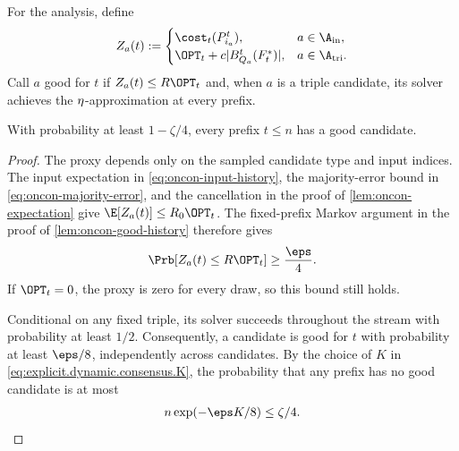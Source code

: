 For the analysis, define
\begin{align}
    \edproxy{a}{t}:=
    \begin{cases}
        \cost_t(P_{i_a}^t),&a\in\A_{\rm in},\\
        \OPT_t+c|B_{Q_a}^t(F_t^*)|,&a\in\A_{\rm tri}.
    \end{cases}
    \label{eq:explicit.consensus.proxy}
\end{align}
Call $ a $ good for $ t $ if $ \edproxy{a}{t}\le R\OPT_t $ and, when $ a $ is a triple candidate, its solver achieves the $ \eta $-approximation at every prefix.

\begin{lemma}\label{lem:explicit.good.candidate}
With probability at least $ 1-\zeta/4 $, every prefix $ t\le n $ has a good candidate.
\end{lemma}
\begin{proof}
The proxy depends only on the sampled candidate type and input indices.
The input expectation in \eqref{eq:oncon-input-history}, the majority-error bound in \eqref{eq:oncon-majority-error}, and the cancellation in the proof of \cref{lem:oncon-expectation} give $ \E[\edproxy{a}{t}]\le R_0\OPT_t $.
The fixed-prefix Markov argument in the proof of \cref{lem:oncon-good-history} therefore gives
\begin{align}
    \Prb[\edproxy{a}{t}\le R\OPT_t]\ge\frac{\eps}{4}.
    \label{eq:explicit.consensus.proxy.success}
\end{align}
If $ \OPT_t=0 $, the proxy is zero for every draw, so this bound still holds.

Conditional on any fixed triple, its solver succeeds throughout the stream with probability at least $ 1/2 $.
Consequently, a candidate is good for $ t $ with probability at least $ \eps/8 $, independently across candidates.
By the choice of $ K $ in \eqref{eq:explicit.dynamic.consensus.K}, the probability that any prefix has no good candidate is at most
\begin{align}
    n\exp(-\eps K/8)\le\zeta/4.
    \label{eq:explicit.consensus.candidate.event}
\end{align}
\end{proof}

